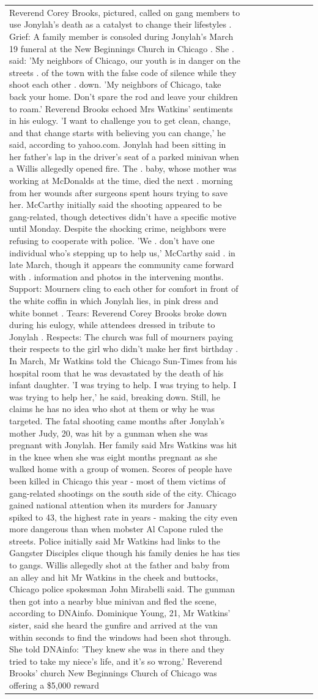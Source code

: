 \begin{table}[H]
\begin{tabular}{lllrlllll}
Reverend Corey Brooks, pictured, called on gang members to use Jonylah's death as a catalyst to change their lifestyles . Grief: A family member is consoled during Jonylah's March 19 funeral at the New Beginnings Church in Chicago . She . said: 'My neighbors of Chicago, our youth is in danger on the streets . of the town with the false code of silence while they shoot each other . down. 'My neighbors of Chicago, take back your home. Don't spare the rod and leave your children to roam.' Reverend Brooks echoed Mrs Watkins' sentiments in his eulogy. 'I want to challenge you to get clean, change, and that change starts with believing you can change,' he said, according to yahoo.com. Jonylah had been sitting in her father's lap in the driver's seat of a parked minivan when a Willis allegedly opened fire. The . baby, whose mother was working at McDonalds at the time, died the next . morning from her wounds after surgeons spent hours trying to save her. McCarthy initially said the shooting appeared to be gang-related, though detectives didn't have a specific motive until Monday. Despite the shocking crime, neighbors were refusing to cooperate with police. 'We . don't have one individual who's stepping up to help us,' McCarthy said . in late March, though it appears the community came forward with . information and photos in the intervening months. Support: Mourners cling to each other for comfort in front of the white coffin in which Jonylah lies, in pink dress and white bonnet . Tears: Reverend Corey Brooks broke down during his eulogy, while attendees dressed in tribute to Jonylah . Respects: The church was full of mourners paying their respects to the girl who didn't make her first birthday . In March, Mr Watkins told the Chicago Sun-Times from his hospital room that he was devastated by the death of his infant daughter. 'I was trying to help. I was trying to help. I was trying to help her,' he said, breaking down. Still, he claims he has no idea who shot at them or why he was targeted. The fatal shooting came months after Jonylah's mother Judy, 20, was hit by a gunman when she was pregnant with Jonylah. Her family said Mrs Watkins was hit in the knee when she was eight months pregnant as she walked home with a group of women. Scores of people have been killed in Chicago this year - most of them victims of gang-related shootings on the south side of the city. Chicago gained national attention when its murders for January spiked to 43, the highest rate in years - making the city even more dangerous than when mobster Al Capone ruled the streets. Police initially said Mr Watkins had links to the Gangster Disciples clique though his family denies he has ties to gangs. Willis allegedly shot at the father and baby from an alley and hit Mr Watkins in the cheek and buttocks, Chicago police spokesman John Mirabelli said. The gunman then got into a nearby blue minivan and fled the scene, according to DNAinfo. Dominique Young, 21, Mr Watkins' sister, said she heard the gunfire and arrived at the van within seconds to find the windows had been shot through. She told DNAinfo: 'They knew she was in there and they tried to take my niece's life, and it's so wrong.' Reverend Brooks' church New Beginnings Church of Chicago was offering a \$5,000 reward 
\end{tabular}
\end{table}
